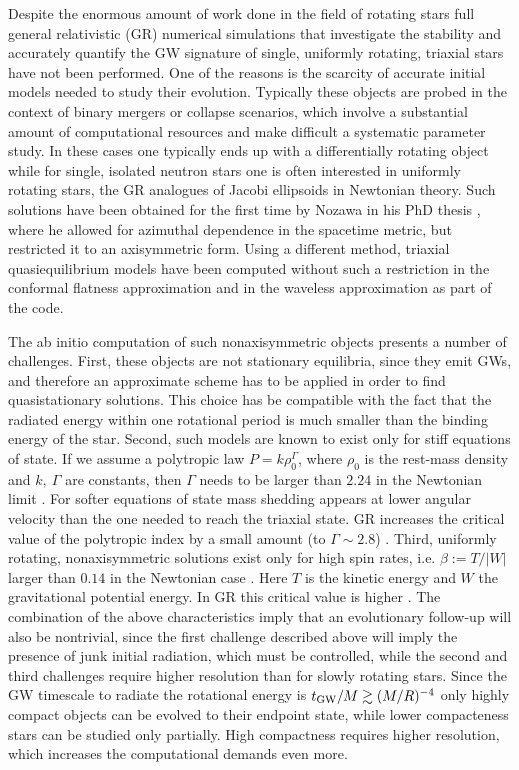 \documentclass[twocolumn,superscriptaddress,showpacs,prd,aps,amsmath,amssymb,nofootinbib]{revtex4-1}
\newcommand{\GR}{\rho}
\begin{document}
Despite the enormous amount of work done in the field of rotating
stars \cite{FS2013,PS2016} full general relativistic (GR) numerical
simulations that investigate the stability and accurately quantify the
GW signature of single, uniformly rotating, triaxial stars have not
been performed.  One of the reasons is the scarcity of accurate
initial models needed to study their evolution.  Typically these
objects are probed in the context of binary mergers or collapse
scenarios, which involve a substantial amount of computational
resources and make difficult a systematic parameter study. In these
cases one typically ends up with a differentially rotating object
while for single, isolated neutron stars one is often interested in
uniformly rotating stars, the GR analogues of Jacobi ellipsoids in
Newtonian theory. Such solutions have been obtained for the first time
by Nozawa in his PhD thesis \cite{N1997}, where he allowed for
azimuthal dependence in the spacetime metric, but restricted it to an
axisymmetric form. Using a different method, triaxial quasiequilibrium
models have been computed without such a restriction in the conformal
flatness approximation \cite{HMSU2008} and in the waveless
approximation \cite{UTGHSTY2016} as part of the \cocal{} code.

The ab initio computation of such nonaxisymmetric objects presents a
number of challenges. First, these objects are not stationary
equilibria, since they emit GWs, and therefore an approximate scheme
has to be applied in order to find quasistationary solutions.  This
choice has be compatible with the fact that the radiated energy within
one rotational period is much smaller than the binding energy of the
star.  Second, such models are known to exist only for stiff equations
of state.  If we assume a polytropic law $P=k\rho_0^\Gamma$, where
$\GR_0$ is the rest-mass density and $k,\ \Gamma$ are constants, then
$\Gamma$ needs to be larger than $2.24$ in the Newtonian limit
\cite{James64}. For softer equations of state mass shedding appears at
lower angular velocity than the one needed to reach the triaxial
state. GR increases the critical value of the polytropic index by a
small amount (to $\Gamma\sim 2.8$) \cite{BFG1996}.  Third, uniformly
rotating, nonaxisymmetric solutions exist only for high spin rates,
i.e. $\beta:=T/|W|$ larger than $0.14$ in the Newtonian case
\cite{Ch69}.  Here $T$ is the kinetic energy and $W$ the gravitational
potential energy.  In GR this critical value is higher \cite{SZ1996,
  BFG1998, GV2002, Saijo2006, RG2002, SL1996, YE1997}.  The
combination of the above characteristics imply that an evolutionary
follow-up will also be nontrivial, since the first challenge described
above will imply the presence of junk initial radiation, which must be
controlled, while the second and third challenges require higher
resolution than for slowly rotating stars.  Since the GW timescale to
radiate the rotational energy is $t_{\rm GW}/M \gtrsim (M/R)^{-4}$
only highly compact objects can be evolved to their endpoint state,
while lower compacteness stars can be studied only partially. High
compactness requires higher resolution, which increases the
computational demands even more.
\end{document}
